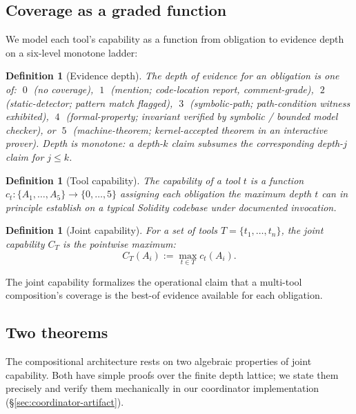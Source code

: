 \documentclass[11pt,a4paper]{article}
\newtheorem{definition}[theorem]{Definition}
\begin{document}
\subsection{Coverage as a graded function}

We model each tool's capability as a function from obligation to evidence depth on a six-level monotone ladder:

\begin{definition}[Evidence depth]\label{def:depth}
The \emph{depth} of evidence for an obligation is one of:
$\;0\;$ (no coverage),
$\;1\;$ (mention; code-location report, comment-grade),
$\;2\;$ (static-detector; pattern match flagged),
$\;3\;$ (symbolic-path; path-condition witness exhibited),
$\;4\;$ (formal-property; invariant verified by symbolic / bounded model checker), or
$\;5\;$ (machine-theorem; kernel-accepted theorem in an interactive prover).
Depth is monotone: a depth-$k$ claim subsumes the corresponding depth-$j$ claim for $j \leq k$.
\end{definition}

\begin{definition}[Tool capability]\label{def:capability}
The \emph{capability} of a tool $t$ is a function $c_t : \{A_1, \ldots, A_5\} \to \{0, \ldots, 5\}$ assigning each obligation the maximum depth $t$ can in principle establish on a typical Solidity codebase under documented invocation.
\end{definition}

\begin{definition}[Joint capability]\label{def:joint}
For a set of tools $T = \{t_1, \ldots, t_n\}$, the \emph{joint capability} $C_T$ is the pointwise maximum:
\[
  C_T(A_i) := \max_{t \in T} c_t(A_i).
\]
\end{definition}

The joint capability formalizes the operational claim that a multi-tool composition's coverage is the best-of evidence available for each obligation.

\subsection{Two theorems}

The compositional architecture rests on two algebraic properties of joint capability. Both have simple proofs over the finite depth lattice; we state them precisely and verify them mechanically in our coordinator implementation (\S\ref{sec:coordinator-artifact}).
\end{document}
